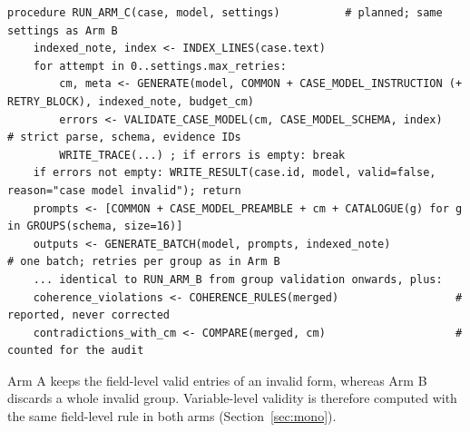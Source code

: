 \begin{lstlisting}[mathescape=true]
procedure RUN_ARM_C(case, model, settings)          # planned; same settings as Arm B
    indexed_note, index <- INDEX_LINES(case.text)
    for attempt in 0..settings.max_retries:
        cm, meta <- GENERATE(model, COMMON + CASE_MODEL_INSTRUCTION (+ RETRY_BLOCK), indexed_note, budget_cm)
        errors <- VALIDATE_CASE_MODEL(cm, CASE_MODEL_SCHEMA, index)   # strict parse, schema, evidence IDs
        WRITE_TRACE(...) ; if errors is empty: break
    if errors not empty: WRITE_RESULT(case.id, model, valid=false, reason="case model invalid"); return
    prompts <- [COMMON + CASE_MODEL_PREAMBLE + cm + CATALOGUE(g) for g in GROUPS(schema, size=16)]
    outputs <- GENERATE_BATCH(model, prompts, indexed_note)            # one batch; retries per group as in Arm B
    ... identical to RUN_ARM_B from group validation onwards, plus:
    coherence_violations <- COHERENCE_RULES(merged)                  # reported, never corrected
    contradictions_with_cm <- COMPARE(merged, cm)                    # counted for the audit
\end{lstlisting}

Arm A keeps the field-level valid entries of an invalid form, whereas Arm B discards a whole invalid group.
Variable-level validity is therefore computed with the same field-level rule in both arms (Section~\ref{sec:mono}).
